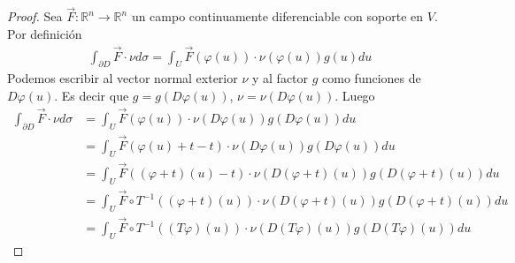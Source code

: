 \documentclass{report}
\newcommand{\realNumbers}{\mathbb{R}}
\theoremstyle{remark}
\begin{document}
\begin{proof}
    Sea \(\vec{F} : \realNumbers^n \rightarrow \realNumbers^n\) un campo continuamente diferenciable con soporte en \(V\).
    Por definición
    \begin{align}
      \int_{\partial D} \vec{F} \cdot \nu d \sigma
      =
      \int_U
        \vec{F}(\varphi(u))
        \cdot
        \nu(\varphi(u))
        g(u)
      du
    \end{align}
    Podemos escribir al vector normal exterior \(\nu\) y al factor \(g\) como funciones de \(D \varphi (u)\).
    Es decir que \(g = g(D \varphi (u))\), \(\nu = \nu(D\varphi(u))\). %
    Luego
    \begin{align}
      \int_{\partial D} \vec{F} \cdot \nu d \sigma
      &=
      \int_U
        \vec{F}(\varphi(u))
        \cdot
        \nu(D \varphi(u))
        g(D \varphi(u))
      du
      \\
      &=
      \int_U
        \vec{F}(\varphi(u) + t - t)
        \cdot
        \nu(D \varphi(u))
        g(D \varphi(u))
      du
      \\
      &=
      \int_U
        \vec{F}((\varphi + t)(u) - t)
        \cdot
        \nu(D (\varphi + t)(u))
        g(D (\varphi + t)(u))
      du
      \\
      &=
      \int_U
        \vec{F} \circ T^{- 1} ((\varphi + t)(u))
        \cdot
        \nu(D (\varphi + t)(u))
        g(D (\varphi + t)(u))
      du
      \\
      &=
      \int_U
        \vec{F} \circ T^{- 1} ((T \varphi)(u))
        \cdot
        \nu(D (T \varphi)(u))
        g(D (T \varphi)(u))
      du
    \end{align}
  \end{proof}
\end{document}
